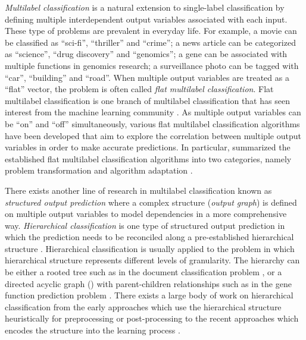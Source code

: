 \textit{Multilabel classification} is a natural extension to single-label classification by defining multiple interdependent output variables associated with each input.
These type of problems are prevalent in everyday life.
For example, a movie can be classified as ``sci-fi'', ``thriller'' and ``crime''; a news article can be categorized as ``science'', ``drug discovery'' and ``genomics''; a gene can be associated with multiple functions in genomics research; a surveillance photo can be tagged with ``car'', ``building'' and ``road''. 
When multiple output variables are treated as a ``flat'' vector, the problem is often called \textit{flat multilabel classification}.
Flat multilabel classification is one branch of multilabel classification that has seen interest from the machine learning community \citep{Tsoumakas07multi,Tsoumakas10mining}.
As multiple output variables can be ``on'' and ``off'' simultaneously, various flat multilabel classification algorithms have been developed that aim to explore the correlation between multiple output variables in order to make accurate predictions.
In particular, \citet{Tsoumakas07multi} summarized the established flat multilabel classification algorithms into two categories, namely problem transformation \citep{Zhang05a,Read09classifier,Cheng09combining} and algorithm adaptation \citep{Schapire99improved,Bian12corrlog}.


There exists another line of research in multilabel classification known as \textit{structured output prediction} where a complex structure (\textit{output graph}) is defined on multiple output variables to model dependencies in a more comprehensive way.
\textit{Hierarchical classification} is one type of structured output prediction in which the prediction needs to be reconciled along a pre-established hierarchical structure \citep{Silla11a}.
Hierarchical classification is usually applied to the problem in which hierarchical structure represents different levels of granularity. 
The hierarchy can be either a rooted tree such as in the document classification problem \citep{Hao07hierarchicaly,Li07hierarchical,Rousu06}, or a directed acyclic graph (\daggraph) with parent-children relationships such as in the gene function prediction problem \citep{Barutcuoglu06hierarchical}.
There exists a large body of work on hierarchical classification from the early approaches which use the hierarchical structure heuristically for preprocessing or post-processing \citep{Koller97hierarchically,Dumais00Hierarchical,Liu05support,DeCoro07bayesian} to the recent approaches which encodes the structure into the learning process \citep{Cai04hierarchical,Cesabianchi05incremental,Rousu06,Gopal12bayesian}.

